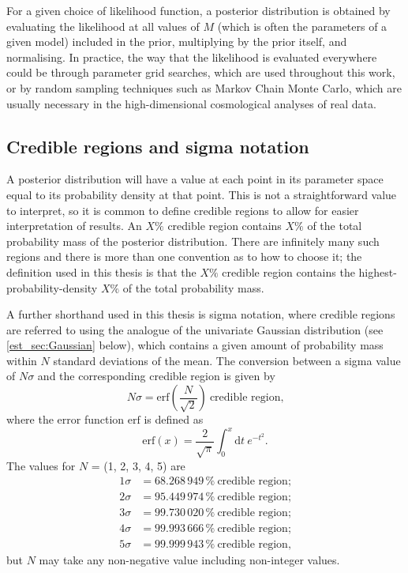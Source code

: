 For a given choice of likelihood function, a posterior distribution is obtained by evaluating the likelihood at all values of $M$ (which is often the parameters of a given model) included in the prior, multiplying by the prior itself, and normalising. In practice, the way that the likelihood is evaluated everywhere could be through parameter grid searches, which are used throughout this work, or by random sampling techniques such as Markov Chain Monte Carlo, which are usually necessary in the high-dimensional cosmological analyses of real data.

\subsection{Credible regions and sigma notation}
\label{est_Sec:credible_regions_sigma_notation}

A posterior distribution will have a value at each point in its parameter space equal to its probability density at that point. This is not a straightforward value to interpret, so it is common to define credible regions to allow for easier interpretation of results. An $X\%$ credible region contains $X\%$ of the total probability mass of the posterior distribution. There are infinitely many such regions and there is more than one convention as to how to choose it; the definition used in this thesis is that the $X\%$ credible region contains the highest-probability-density $X\%$ of the total probability mass.

A further shorthand used in this thesis is sigma notation, where credible regions are referred to using the analogue of the univariate Gaussian distribution (see \autoref{est_sec:Gaussian} below), which contains a given amount of probability mass within $N$ standard deviations of the mean. The conversion between a sigma value of $N\sigma$ and the corresponding credible region is given by
\begin{equation}
N\sigma = \text{erf}{\left( \frac{N}{\sqrt{2}} \right)}~\text{credible region,}
\end{equation}
where the error function $\text{erf}$ is defined as
\begin{equation}
\text{erf}{\left( x \right)}
= \frac{2}{\sqrt{\pi}} \int_0^x{ \text{d}t ~ e^{-t^2} }.
\end{equation}
The values for $N$ = (1, 2, 3, 4, 5) are
\begin{align}
1 \sigma &= 68.268\,949\,\%~\text{credible region;} \\
2 \sigma &= 95.449\,974\,\%~\text{credible region;} \\
3 \sigma &= 99.730\,020\,\%~\text{credible region;} \\
4 \sigma &= 99.993\,666\,\%~\text{credible region;} \\
5 \sigma &= 99.999\,943\,\%~\text{credible region,}
\end{align}
but $N$ may take any non-negative value including non-integer values.

